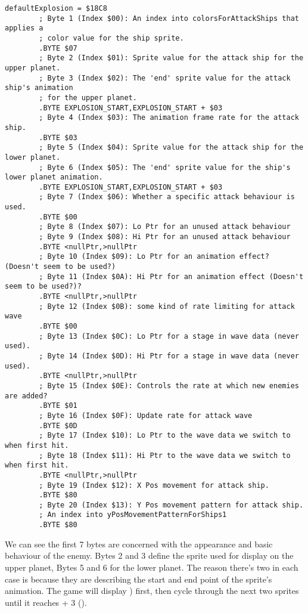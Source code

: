 \begin{lstlisting}
defaultExplosion = $18C8
        ; Byte 1 (Index $00): An index into colorsForAttackShips that applies a
        ; color value for the ship sprite.
        .BYTE $07
        ; Byte 2 (Index $01): Sprite value for the attack ship for the upper planet.
        ; Byte 3 (Index $02): The 'end' sprite value for the attack ship's animation
        ; for the upper planet.
        .BYTE EXPLOSION_START,EXPLOSION_START + $03
        ; Byte 4 (Index $03): The animation frame rate for the attack ship.
        .BYTE $03
        ; Byte 5 (Index $04): Sprite value for the attack ship for the lower planet.
        ; Byte 6 (Index $05): The 'end' sprite value for the ship's lower planet animation.
        .BYTE EXPLOSION_START,EXPLOSION_START + $03
        ; Byte 7 (Index $06): Whether a specific attack behaviour is used.
        .BYTE $00
        ; Byte 8 (Index $07): Lo Ptr for an unused attack behaviour
        ; Byte 9 (Index $08): Hi Ptr for an unused attack behaviour
        .BYTE <nullPtr,>nullPtr
        ; Byte 10 (Index $09): Lo Ptr for an animation effect? (Doesn't seem to be used?)
        ; Byte 11 (Index $0A): Hi Ptr for an animation effect (Doesn't seem to be used?)?
        .BYTE <nullPtr,>nullPtr
        ; Byte 12 (Index $0B): some kind of rate limiting for attack wave
        .BYTE $00
        ; Byte 13 (Index $0C): Lo Ptr for a stage in wave data (never used).
        ; Byte 14 (Index $0D): Hi Ptr for a stage in wave data (never used).
        .BYTE <nullPtr,>nullPtr
        ; Byte 15 (Index $0E): Controls the rate at which new enemies are added?
        .BYTE $01
        ; Byte 16 (Index $0F): Update rate for attack wave
        .BYTE $0D
        ; Byte 17 (Index $10): Lo Ptr to the wave data we switch to when first hit.
        ; Byte 18 (Index $11): Hi Ptr to the wave data we switch to when first hit.
        .BYTE <nullPtr,>nullPtr
        ; Byte 19 (Index $12): X Pos movement for attack ship.
        .BYTE $80
        ; Byte 20 (Index $13): Y Pos movement pattern for attack ship.
        ; An index into yPosMovementPatternForShips1
        .BYTE $80
\end{lstlisting}

We can see the first 7 bytes are concerned with the appearance and basic behaviour of the
enemy. Bytes 2 and 3 define the sprite used for display on the upper planet, Bytes 5 and 6
for the lower planet. The reason there's two in each case is because they are describing the
start and end point of the sprite's animation. The game will display  ) first,
then cycle through the next two sprites until it reaches  + 3 (). 

